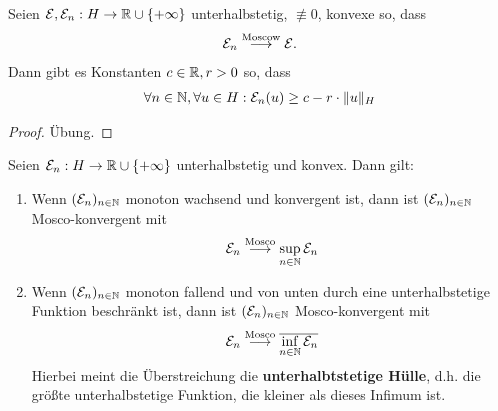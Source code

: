 \begin{lemma}
	Seien $\mathcal{E},\mathcal{E}_n:H\to\mathbb{R}\cup\lbrace+\infty\rbrace$ unterhalbstetig, $\not\equiv0$, konvexe so, dass 
	\begin{align*}
		\mathcal{E}_n\overset{\text{Moscow}}{\longrightarrow}\mathcal{E}.
	\end{align*}
	Dann gibt es Konstanten $c\in\mathbb{R},r>0$ so, dass 
	\begin{align*}
		\forall n\in\mathbb{N},\forall u\in H:
		\mathcal{E}_n(u)\geq c-r\cdot\Vert u\Vert_H
	\end{align*}
\end{lemma}

\begin{proof}
	Übung.
\end{proof}

\begin{theorem}
	Seien $\mathcal{E}_n:H\to\mathbb{R}\cup\lbrace+\infty\rbrace$ unterhalbstetig und konvex.
	Dann gilt:
	\begin{enumerate}[label=(\alph*)]
		\item Wenn $(\mathcal{E}_n)_{n\in\mathbb{N}}$ monoton wachsend und konvergent ist, dann ist $(\mathcal{E}_n)_{n\in\mathbb{N}}$ Mosco-konvergent mit
		\begin{align*}
			\mathcal{E}_n\overset{\text{Mosco}}{\longrightarrow}\sup\limits_{n\in\mathbb{N}}\mathcal{E}_n
		\end{align*}
		\item Wenn $(\mathcal{E}_n)_{n\in\mathbb{N}}$ monoton fallend und von unten durch eine unterhalbstetige Funktion beschränkt ist,
		dann ist $(\mathcal{E}_n)_{n\in\mathbb{N}}$ Mosco-konvergent mit
		\begin{align*}
			\mathcal{E}_n\overset{\text{Mosco}}{\longrightarrow}\overline{\inf\limits_{n\in\mathbb{N}}\mathcal{E}_n}
		\end{align*}
		Hierbei meint die Überstreichung die \textbf{unterhalbtstetige Hülle}, d.h. die größte unterhalbstetige Funktion, die kleiner als dieses Infimum ist.
	\end{enumerate}
\end{theorem}

